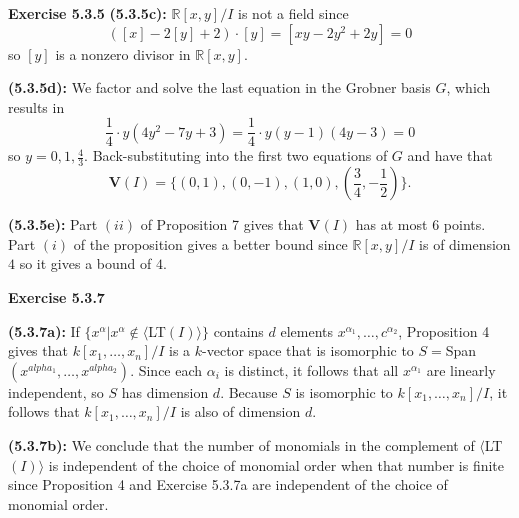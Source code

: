 \documentclass[12pt,oneside]{article}
\newenvironment{exercise}[1]{\vspace{.1in}\noindent\textbf{Exercise #1 \hspace{.05em}}}{}
\newcommand{\R}{\mathbb{R}}
\begin{document}
\begin{exercise}{5.3.5}
    \bigskip
    \textbf{(5.3.5c):}
    $\R[x,y]/I$ is not a field since 
    \[
        ([x]-2[y]+2)\cdot[y] = [xy-2y^2+2y]=0
    \]
    so $[y]$ is a nonzero divisor in $\R[x,y]$.

    \bigskip
    \textbf{(5.3.5d):}
    We factor and solve the last equation in the Grobner basis $G$, 
    which results in 
    \[
        \frac{1}{4}\cdot y(4y^2-7y+3)=\frac{1}{4}\cdot y(y-1)(4y-3)=0     
    \]
    so $y = 0,1,\frac{4}{3}$. Back-substituting into the first two 
    equations of $G$ and have that 
    \[
        \mathbf{V}(I)=\{(0,1),(0,-1),(1,0),(\frac{3}{4},-\frac{1}{2})\}.
    \]

    \bigskip
    \textbf{(5.3.5e):}
    Part $(ii)$ of Proposition 7 gives that $\mathbf{V}(I)$ has 
    at most $6$ points. Part $(i)$ of the proposition gives a 
    better bound since $\R[x,y]/I$ is of dimension $4$ so it 
    gives a bound of $4$.

\end{exercise}


\begin{exercise}{5.3.7}

    \bigskip
    \textbf{(5.3.7a):}
    If $\{x^\alpha \vert x^\alpha \not \in \langle$LT$(I)\rangle\}$ contains 
    $d$ elements $x^{\alpha_1},\ldots,c^{\alpha_2}$, Proposition 4 
    gives that $k[x_1,\ldots,x_n]/I$ is a $k$-vector space that 
    is isomorphic to $S =$Span$(x^{alpha_1},\ldots,x^{alpha_2})$. 
    Since each $\alpha_i$ is distinct, it follows that all $x^{\alpha_1}$ 
    are linearly independent, so $S$ has dimension $d$. Because $S$ 
    is isomorphic to $k[x_1,\ldots,x_n]/I$, it follows that $k[x_1,\ldots,x_n]/I$ 
    is also of dimension $d$.

    \bigskip
    \textbf{(5.3.7b):}
    We conclude that the number of monomials in the complement of $\langle$LT$(I)\rangle$ 
    is independent of the choice of monomial order when that number 
    is finite since Proposition 4 and Exercise 5.3.7a are independent 
    of the choice of monomial order.

\end{exercise}

\end{document}

